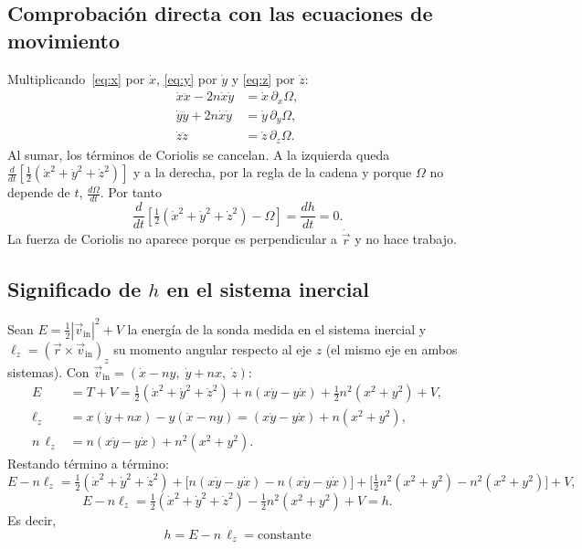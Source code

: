 \documentclass[12pt,letterpaper]{article}
\begin{document}
\subsection{Comprobación directa con las ecuaciones de movimiento}

Multiplicando~\eqref{eq:x} por $\dot x$, \eqref{eq:y} por $\dot y$ y \eqref{eq:z} por $\dot z$:
\begin{align*}
\dot x\ddot x - 2n\dot x\dot y &= \dot x\,\partial_x\Omega,\\
\dot y\ddot y + 2n\dot x\dot y &= \dot y\,\partial_y\Omega,\\
\dot z\ddot z &= \dot z\,\partial_z\Omega .
\end{align*}
Al sumar, los términos de Coriolis se cancelan. A la izquierda queda
$\frac{d}{dt}\left[\tfrac12(\dot x^2+\dot y^2+\dot z^2)\right]$ y a la derecha, por la regla de
la cadena y porque $\Omega$ no depende de $t$, $\frac{d\Omega}{dt}$. Por tanto
\[
\frac{d}{dt}\left[\tfrac12(\dot x^2+\dot y^2+\dot z^2) - \Omega\right] = \frac{dh}{dt} = 0 .
\]
La fuerza de Coriolis no aparece porque es perpendicular a $\dot{\vec r}$ y no hace trabajo.

\subsection{Significado de $h$ en el sistema inercial}

Sean $E = \tfrac12|\vec v_{\mathrm{in}}|^2 + V$ la energía de la sonda medida en el sistema
inercial y $\ell_z = (\vec r\times\vec v_{\mathrm{in}})_z$ su momento angular respecto al eje
$z$ (el mismo eje en ambos sistemas). Con
$\vec v_{\mathrm{in}} = (\dot x - ny,\; \dot y + nx,\; \dot z)$:
\begin{align*}
E &= T + V = \tfrac12(\dot x^2+\dot y^2+\dot z^2) + n(x\dot y - y\dot x) + \tfrac12 n^2(x^2+y^2) + V,\\
\ell_z &= x(\dot y + n x) - y(\dot x - n y) = (x\dot y - y\dot x) + n(x^2+y^2),\\
n\,\ell_z &= n(x\dot y - y\dot x) + n^2(x^2+y^2).
\end{align*}
Restando término a término:
\[
E - n\ell_z = \tfrac12(\dot x^2+\dot y^2+\dot z^2)
+ \bigl[n(x\dot y - y\dot x) - n(x\dot y - y\dot x)\bigr]
+ \bigl[\tfrac12 n^2(x^2+y^2) - n^2(x^2+y^2)\bigr] + V,
\]
\[
E - n\ell_z = \tfrac12(\dot x^2+\dot y^2+\dot z^2) - \tfrac12 n^2(x^2+y^2) + V = h .
\]
Es decir,
\begin{equation}
\boxed{\,h = E - n\,\ell_z = \text{constante}\,}
\label{eq:Enl}
\end{equation}
\end{document}
